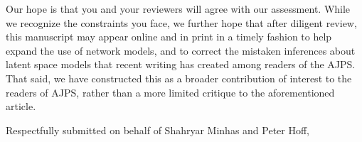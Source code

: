 \documentclass[10pt]{letter}
\begin{document}
\begin{letter}
Our hope is that you and your reviewers will agree with our assessment. While we recognize the constraints you face, we further hope that after diligent review, this manuscript may appear online and in print in a timely fashion to help expand the use of network models, and to correct the mistaken inferences about latent space models that recent writing has created among readers of the AJPS. That said, we have constructed this as a broader contribution of interest to the readers of AJPS, rather than a more limited critique to the aforementioned article.

\closing{Respectfully submitted on behalf of Shahryar Minhas and Peter Hoff,} \vspace{.1in}


\end{letter}
\end{document}
